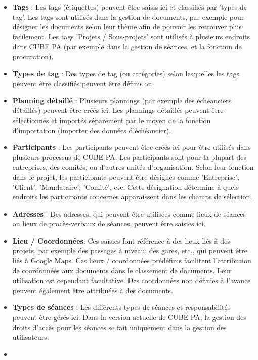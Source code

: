 \begin{itemize}
\item
\textbf{Tags} : Les tags (étiquettes) peuvent être saisis ici et classifiés par 'types de tag'. Les tags sont utilisés dans la gestion de documents, par exemple pour désigner les documents selon leur thème afin de pouvoir les retrouver plus facilement. Les tags 'Projets / Sous-projets' sont utilisés à plusieurs endroits dans CUBE PA (par exemple dans la gestion de séances, et la fonction de procuration).
\item
\textbf{Types de tag} : Des types de tag (ou catégories) selon lesquelles les tags peuvent être classifiés peuvent être définis ici.
\item
\textbf{Planning détaillé} : Plusieurs plannings (par exemple des échéanciers détaillés) peuvent être créés ici. Les plannings détaillés peuvent être sélectionnés et importés séparément par le moyen de la fonction d'importation (importer des données d'échéancier).
\item
\textbf{Participants} : Les participants peuvent être créés ici pour être utilisés dans plusieurs processus de CUBE PA. Les participants sont pour la plupart des entreprises, des comités, ou d'autres unités d'organisation. Selon leur fonction dans le projet, les participants peuvent être désignés comme 'Entreprise', 'Client', 'Mandataire', 'Comité', etc. Cette désignation détermine à quels endroits les participants concernés apparaissent dans les champs de sélection.
\item
\textbf{Adresses} : Des adresses, qui peuvent être utilisées comme lieux de séances ou lieux de procès-verbaux de séances, peuvent être saisies ici.
\item
\textbf{Lieu / Coordonnées}: Ces saisies font référence à des lieux liés à des projets, par exemple des passages à niveau, des gares, etc., qui peuvent être liés à Google Maps. Ces lieux / coordonnées prédéfinis facilitent l'attribution de coordonnées aux documents dans le classement de documents. Leur utilisation est cependant facultative. Des coordonnées non définies à l'avance peuvent également être attribuées à des documents.
\item
\textbf{Types de séances} : Les différents types de séances et responsabilités peuvent être gérés ici. Dans la version actuelle de CUBE PA, la gestion des droits d'accès pour les séances se fait uniquement dans la gestion des utilisateurs.
\item

\end{itemize}
